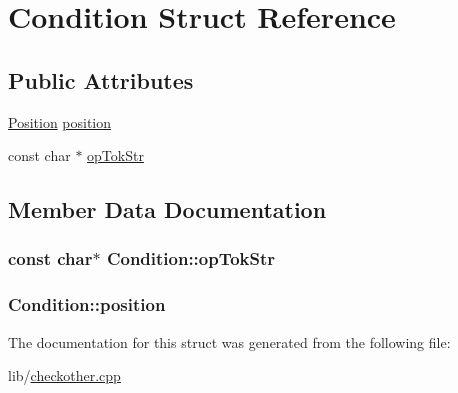 \hypertarget{struct_condition}{\section{Condition Struct Reference}
\label{struct_condition}
}
\subsection*{Public Attributes}
\begin{DoxyCompactItemize}
\item 
\hyperlink{checkother_8cpp_ab91b34ae619fcdfcba4522b4f335bf83}{Position} \hyperlink{struct_condition_a2983255dd159ab2c17b30681ce0e6eb4}{position}
\item 
const char $\ast$ \hyperlink{struct_condition_afcb310f05f4e0351759b7c5746979d17}{op\-Tok\-Str}
\end{DoxyCompactItemize}


\subsection{Member Data Documentation}
\hypertarget{struct_condition_afcb310f05f4e0351759b7c5746979d17}{
\subsubsection[{op\-Tok\-Str}]{\setlength{\rightskip}{0pt plus 5cm}const char$\ast$ Condition\-::op\-Tok\-Str}}\label{struct_condition_afcb310f05f4e0351759b7c5746979d17}
\hypertarget{struct_condition_a2983255dd159ab2c17b30681ce0e6eb4}{
\subsubsection[{position}]{ Condition\-::position}}\label{struct_condition_a2983255dd159ab2c17b30681ce0e6eb4}


The documentation for this struct was generated from the following file\-:\begin{DoxyCompactItemize}
\item 
lib/\hyperlink{checkother_8cpp}{checkother.\-cpp}\end{DoxyCompactItemize}
